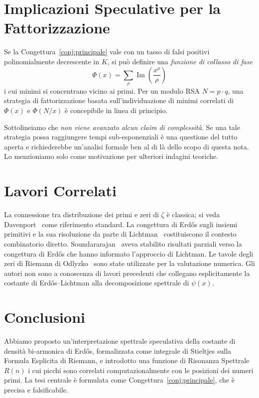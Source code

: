 \documentclass[11pt,a4paper]{article}
\begin{document}
\section{Implicazioni Speculative per la Fattorizzazione}

Se la Congettura~\ref{conj:principale} vale con un tasso di falsi positivi
polinomialmente decrescente in $K$, si pu\`o definire una \emph{funzione di
collasso di fase}
\begin{equation}
  \Phi(x) = \sum_{\rho} \operatorname{Im}\!\left(\frac{x^{\rho}}{\rho}\right)
\end{equation}
i cui minimi si concentrano vicino ai primi. Per un modulo RSA $N = p \cdot q$,
una strategia di fattorizzazione basata sull'individuazione di minimi correlati di
$\Phi(x)$ e $\Phi(N/x)$ \`e concepibile in linea di principio.

Sottolineiamo che \emph{non viene avanzato alcun claim di complessit\`a}. Se una
tale strategia possa raggiungere tempi sub-esponenziali \`e una questione del tutto
aperta e richiederebbe un'analisi formale ben al di l\`a dello scopo di questa nota.
Lo menzioniamo solo come motivazione per ulteriori indagini teoriche.

\section{Lavori Correlati}

La connessione tra distribuzione dei primi e zeri di $\zeta$ \`e classica; si
veda Davenport~\cite{davenport2000} come riferimento standard. La congettura di
Erd\H{o}s sugli insiemi primitivi e la sua risoluzione da parte di
Lichtman~\cite{lichtman2019} costituiscono il contesto combinatorio diretto.
Soundararajan~\cite{soundararajan2001} aveva stabilito risultati parziali verso
la congettura di Erd\H{o}s che hanno informato l'approccio di Lichtman. Le tavole
degli zeri di Riemann di Odlyzko~\cite{odlyzko} sono state utilizzate per la
valutazione numerica. Gli autori non sono a conoscenza di lavori precedenti che
collegano esplicitamente la costante di Erd\H{o}s--Lichtman alla decomposizione
spettrale di $\psi(x)$.

\section{Conclusioni}

Abbiamo proposto un'interpretazione spettrale speculativa della costante di densit\`a
bi-armonica di Erd\H{o}s, formalizzata come integrale di Stieltjes sulla Formula
Esplicita di Riemann, e introdotto una funzione di Risonanza Spettrale $R(n)$ i cui
picchi sono correlati computazionalmente con le posizioni dei numeri primi. La tesi
centrale \`e formulata come Congettura~\ref{conj:principale}, che \`e precisa e
falsificabile.
\end{document}

